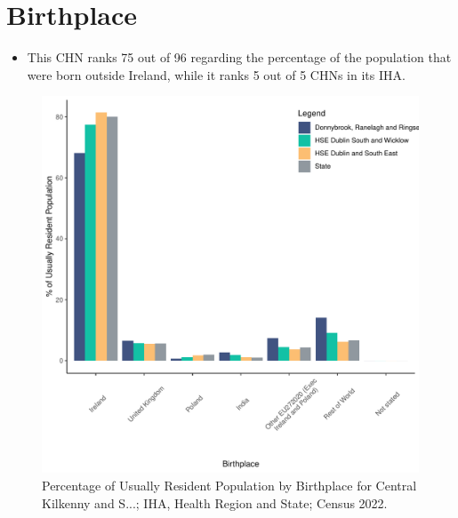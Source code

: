 \documentclass{article}
\begin{document}
\section{Birthplace}\label{sect:Birth}
\begin{itemize}
\item This CHN ranks  75 out of 96 regarding the percentage of the population that were born outside Ireland, while it ranks  5 out of 5 CHNs in its IHA.
\end{itemize}
\begin{figure}[H]
	\centering
	\includegraphics[width = 130mm]{../figures/BirthED.pdf}
	\caption{Percentage of Usually Resident Population by Birthplace for Central Kilkenny and S...; IHA, Health Region and State; Census 2022.}
	\label{fig:vbnv}
	\end{figure}
	
\end{document}
